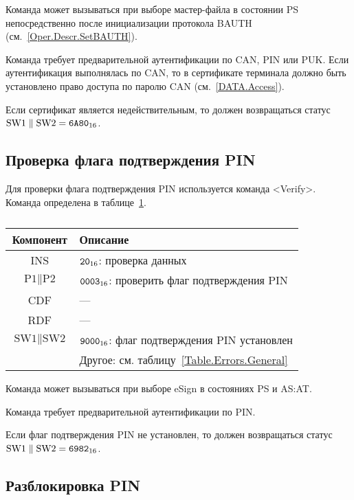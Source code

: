 Команда может вызываться при выборе мастер-файла
в состоянии PS непосредственно после 
инициализации протокола BAUTH (см.~\ref{Oper.Descr.SetBAUTH}).

Команда требует предварительной аутентификации по CAN, PIN или PUK. 
Если аутентификация выполнялась по CAN,
то в сертификате терминала должно быть установлено 
право доступа по паролю CAN (см.~\ref{DATA.Access}).

Если сертификат является недействительным, то должен 
возвращаться статус 
$\text{SW1} \parallel \text{SW2} = \texttt{6A80}_{16}$.

\subsection{Проверка флага подтверждения PIN}
\label{Oper.Descr.VerifyAuth}

Для проверки флага подтверждения PIN используется команда <Verify>.
Команда определена в таблице~\ref{Table.Oper.VerifyAuthCmd}.

\begin{table}[hbt]
\caption{}\label{Table.Oper.VerifyAuthCmd}
\begin{tabular}{|c|p{14cm}|}
\hline
Компонент & Описание \\
\hline
\hline
INS & $\texttt{20}_{16}$: проверка данных\\
\hline
$\text{P1} \parallel \text{P2}$ & $\texttt{0003}_{16}$: проверить 
флаг подтверждения PIN\\
\hline
CDF & --- \\
\hline 
\hline
RDF &  --- \\
\hline
$\text{SW1} \parallel \text{SW2}$ & $\texttt{9000}_{16}$: 
флаг подтверждения PIN установлен\\
\cline{2-2}
 & Другое: см. таблицу~\ref{Table.Errors.General} \\
\hline
\end{tabular}
\end{table}

Команда может вызываться при выборе eSign в состояниях PS и AS:AT. 

Команда требует предварительной аутентификации по PIN.

Если флаг подтверждения PIN не установлен, то должен 
возвращаться статус $\text{SW1} \parallel \text{SW2} = \texttt{6982}_{16}$.

\subsection{Разблокировка PIN}
\label{Oper.Descr.UnblockPIN}

